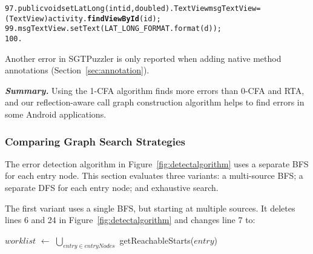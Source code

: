 {\vspace{2mm}
\hspace{3mm}{In class: com.google.android.apps.mytracks.StatsUtilities}
\vspace{-2mm}
\begin{CodeOut}
\begin{alltt}
97.  public void setLatLong(int id, double d) .    TextView msgTextView = (TextView) activity.\textbf{findViewById}(id);
99.    msgTextView.setText(LAT\_LONG\_FORMAT.format(d));
100. \ttrcb
\end{alltt}
\end{CodeOut}}

Another error in SGTPuzzler is only reported when adding native method
annotations (Section~\ref{sec:annotation}). 



\vspace{1mm}

\noindent \textbf{\textit{Summary.}} Using the 1-CFA 
algorithm finds more errors than 0-CFA and RTA, and our reflection-aware
call graph construction algorithm helps to find errors in some
Android applications.


\subsubsection{Comparing Graph Search Strategies}
\label{sec:search}

The error detection algorithm in Figure~\ref{fig:detectalgorithm} uses a
separate BFS for each entry node.  This section evaluates three variants:
a multi-source BFS; a separate DFS for each entry node; and exhaustive
search.

The first variant uses a single BFS, but starting at multiple sources.  It deletes
lines 6 and 24 in Figure~\ref{fig:detectalgorithm} and changes line
7 to:

\vspace{0.2mm}
$\mathit{worklist}$ $\leftarrow$ $\bigcup_{\mathit{entry} \in \mathit{entryNodes}}$ getReachableStarts($\mathit{entry}$)
\vspace{0.2mm}

